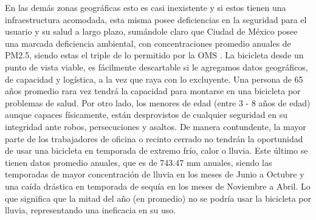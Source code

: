 En las demás zonas geográficas esto es casi inexistente y si estos tienen una infraestructura acomodada, esta misma posee 
deficiencias en la seguridad para el usuario y su salud a largo plazo, sumándole claro que Ciudad de México posee 
una marcada deficiencia ambiental, con concentraciones promedio anuales de PM2.5, siendo estas el triple de lo permitido por 
la OMS \cite{sedema2025informe}. La bicicleta desde un punto de vista viable, es fácilmente descartable si le agregamos datos 
geográficos, de capacidad y logística, a la vez que raya con lo excluyente. Una persona de 65 años promedio rara vez tendrá la 
capacidad para montarse en una bicicleta por problemas de salud. Por otro lado, los menores de edad (entre 3 - 8 años de edad) 
aunque capaces físicamente, están desprovistos de cualquier seguridad en su integridad ante robos, persecuciones y asaltos. 
De manera contundente, la mayor parte de los trabajadores de oficina o recinto cerrado no tendrán la oportunidad de usar 
una bicicleta en temporada de extremo frío, calor o lluvia. Este último se tienen datos promedio anuales, 
que es de 743.47 mm anuales, siendo las temporadas de mayor concentración de lluvia en los meses de Junio a Octubre y una caída 
drástica en temporada de sequía en los meses de Noviembre a Abril. Lo que significa que la mitad del año (en promedio) no se 
podría usar la bicicleta por lluvia, representando una ineficacia en su uso.